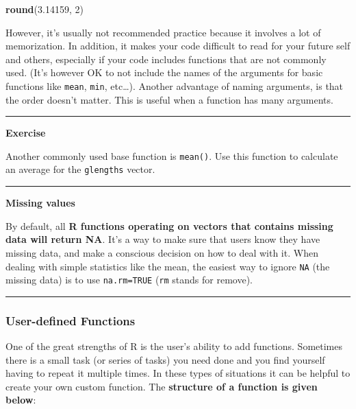 \documentclass[
]{article}
\newenvironment{Shaded}{\begin{snugshade}}{\end{snugshade}}
\newcommand{\DecValTok}[1]{\textcolor[rgb]{0.00,0.00,0.81}{#1}}
\newcommand{\FloatTok}[1]{\textcolor[rgb]{0.00,0.00,0.81}{#1}}
\newcommand{\KeywordTok}[1]{\textcolor[rgb]{0.13,0.29,0.53}{\textbf{#1}}}
\newcommand{\NormalTok}[1]{#1}
\begin{document}
\begin{Shaded}
\begin{Highlighting}[]
\KeywordTok{round}\NormalTok{(}\FloatTok{3.14159}\NormalTok{, }\DecValTok{2}\NormalTok{)}
\end{Highlighting}
\end{Shaded}

However, it's usually not recommended practice because it involves a lot
of memorization. In addition, it makes your code difficult to read for
your future self and others, especially if your code includes functions
that are not commonly used. (It's however OK to not include the names of
the arguments for basic functions like \texttt{mean}, \texttt{min},
etc\ldots). Another advantage of naming arguments, is that the order
doesn't matter. This is useful when a function has many arguments.

\begin{center}\rule{0.5\linewidth}{0.5pt}\end{center}

\textbf{Exercise}

Another commonly used base function is \texttt{mean()}. Use this
function to calculate an average for the \texttt{glengths} vector.

\begin{center}\rule{0.5\linewidth}{0.5pt}\end{center}

\textbf{Missing values}

By default, all \textbf{R functions operating on vectors that contains
missing data will return NA}. It's a way to make sure that users know
they have missing data, and make a conscious decision on how to deal
with it. When dealing with simple statistics like the mean, the easiest
way to ignore \texttt{NA} (the missing data) is to use
\texttt{na.rm=TRUE} (\texttt{rm} stands for remove).

\begin{center}\rule{0.5\linewidth}{0.5pt}\end{center}

\hypertarget{user-defined-functions}{%
\subsubsection{User-defined Functions}\label{user-defined-functions}}

One of the great strengths of R is the user's ability to add functions.
Sometimes there is a small task (or series of tasks) you need done and
you find yourself having to repeat it multiple times. In these types of
situations it can be helpful to create your own custom function. The
\textbf{structure of a function is given below}:
\end{document}
